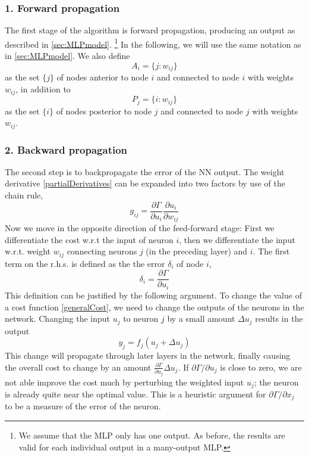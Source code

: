 \documentclass[twoside,english]{uiofysmaster}
\begin{document}
\subsubsection{1. Forward propagation}
The first stage of the algorithm is forward propagation, producing an output as described in \autoref{sec:MLPmodel}.
\footnote{We assume that the MLP only has one output. As before, the results are valid for each individual output in 
a many-output MLP.}
In the following, we will use the same notation as in \autoref{sec:MLPmodel}. We also define
\begin{equation}
 A_i = \{j:w_{ij}\}
\end{equation}
as the set $\{j\}$ of nodes anterior to node $i$ and connected to node $i$ with weights $w_{ij}$, in addition to
\begin{equation}
 P_j = \{i:w_{ij}\}
\end{equation}
as the set $\{i\}$ of nodes posterior to node $j$ and connected to node $j$ with weights $w_{ij}$. 

\subsubsection{2. Backward propagation}
The second step is to backpropagate the error of the NN output. The weight derivative \eqref{partialDerivatives}
can be expanded into two factors by use of the chain rule,
\begin{equation}
 g_{ij} = \frac{\partial \Gamma}{\partial u_i}\frac{\partial u_i}{\partial w_{ij}}
 \label{partialDerivativeExpanded}
\end{equation}
Now we move in the opposite direction of the feed-forward stage: First we differentiate the cost w.r.t 
the input of neuron $i$, then we differentiate the input w.r.t. weight $w_{ij}$ connecting neurons $j$ (in the preceding layer)
and $i$. 
The first term on the r.h.s. is defined as the the error $\delta_i$ of node $i$, 
\begin{equation}
 \delta_i = \frac{\partial\Gamma}{\partial u_i}
 \label{neuronError}
\end{equation}
This definition can be justified by the following argument.
To change the value of a cost function \eqref{generalCost}, we need to change the outputs of the neurons in the network. 
Changing the input $u_j$ to neuron $j$ by a small amount $\Delta u_j$ results in the output
\begin{equation}
 y_j = f_j(u_j + \Delta u_j)
\end{equation}
This change will propagate through later layers in the network, finally causing the overall cost to change
by an amount $\frac{\partial \Gamma}{\partial u_j}\Delta u_j$. If $\partial \Gamma / \partial u_j$ is close to zero,
we are not able improve the cost much by perturbing the weighted input $u_j$; the neuron is already quite near the optimal value.
This is a heuristic argument for $\partial \Gamma / \partial x_j$ to be a measure of the error of the neuron. 
\end{document}
